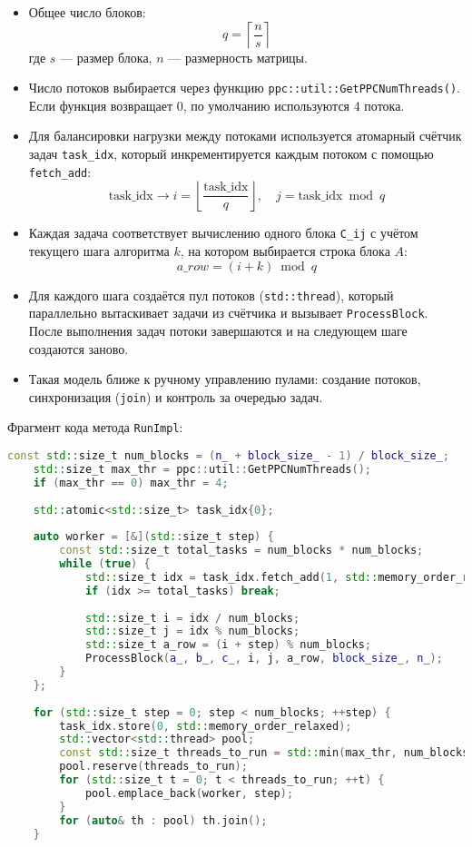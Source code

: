 \documentclass[12pt,a4paper]{extarticle}
\begin{document}
\begin{itemize}
	\item Общее число блоков:
	\[
	q = \left\lceil \frac{n}{s} \right\rceil
	\]
	где \( s \) — размер блока, \( n \) — размерность матрицы.
	
	\item Число потоков выбирается через функцию \texttt{ppc::util::GetPPCNumThreads()}.  
	Если функция возвращает 0, по умолчанию используются 4 потока.
	
	\item Для балансировки нагрузки между потоками используется атомарный счётчик задач \texttt{task\_idx},  
	который инкрементируется каждым потоком с помощью \texttt{fetch\_add}:
	\[
	\text{task\_idx} \rightarrow i = \left\lfloor \frac{\text{task\_idx}}{q} \right\rfloor,\quad j = \text{task\_idx} \bmod q
	\]
	
	\item Каждая задача соответствует вычислению одного блока \texttt{C\_ij} с учётом текущего шага алгоритма \( k \),  
	на котором выбирается строка блока \( A \):  
	\[
	a\_row = (i + k) \bmod q
	\]
	
	\item Для каждого шага создаётся пул потоков (\texttt{std::thread}),  
	который параллельно вытаскивает задачи из счётчика и вызывает \texttt{ProcessBlock}.  
	После выполнения задач потоки завершаются и на следующем шаге создаются заново.
	
	\item Такая модель ближе к ручному управлению пулами: создание потоков, синхронизация (\texttt{join}) и контроль за очередью задач.
	
\end{itemize}

\vspace{1em}
\noindent Фрагмент кода метода \texttt{RunImpl}:

\begin{lstlisting}[language=C++,basicstyle=\ttfamily\small,caption={Функция RunImpl с использованием std::thread}]
	const std::size_t num_blocks = (n_ + block_size_ - 1) / block_size_;
	std::size_t max_thr = ppc::util::GetPPCNumThreads();
	if (max_thr == 0) max_thr = 4;
	
	std::atomic<std::size_t> task_idx{0};
	
	auto worker = [&](std::size_t step) {
		const std::size_t total_tasks = num_blocks * num_blocks;
		while (true) {
			std::size_t idx = task_idx.fetch_add(1, std::memory_order_relaxed);
			if (idx >= total_tasks) break;
			
			std::size_t i = idx / num_blocks;
			std::size_t j = idx % num_blocks;
			std::size_t a_row = (i + step) % num_blocks;
			ProcessBlock(a_, b_, c_, i, j, a_row, block_size_, n_);
		}
	};
	
	for (std::size_t step = 0; step < num_blocks; ++step) {
		task_idx.store(0, std::memory_order_relaxed);
		std::vector<std::thread> pool;
		const std::size_t threads_to_run = std::min(max_thr, num_blocks * num_blocks);
		pool.reserve(threads_to_run);
		for (std::size_t t = 0; t < threads_to_run; ++t) {
			pool.emplace_back(worker, step);
		}
		for (auto& th : pool) th.join();
	}
\end{lstlisting}
\end{document}
